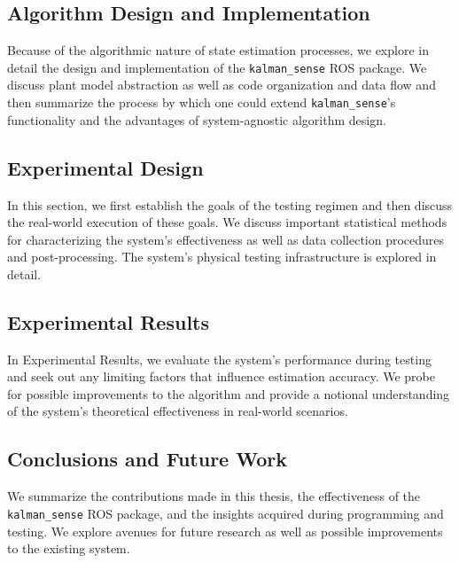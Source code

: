 \subsection*{Algorithm Design and Implementation}

Because of the algorithmic nature of state estimation processes, we explore in detail the design and implementation of the \texttt{kalman\_sense} ROS package. We discuss plant model abstraction as well as code organization and data flow and then summarize the process by which one could extend \texttt{kalman\_sense}'s functionality and the advantages of system-agnostic algorithm design.

\subsection*{Experimental Design}

In this section, we first establish the goals of the testing regimen and then discuss the real-world execution of these goals. We discuss important statistical methods for characterizing the system's effectiveness as well as data collection procedures and post-processing. The system's physical testing infrastructure is explored in detail.

\subsection*{Experimental Results}

In Experimental Results, we evaluate the system's performance during testing and seek out any limiting factors that influence estimation accuracy. We probe for possible improvements to the algorithm and provide a notional understanding of the system's theoretical effectiveness in real-world scenarios.

\subsection*{Conclusions and Future Work}

We summarize the contributions made in this thesis, the effectiveness of the \texttt{kalman\_sense} ROS package, and the insights acquired during programming and testing. We explore avenues for future research as well as possible improvements to the existing system.